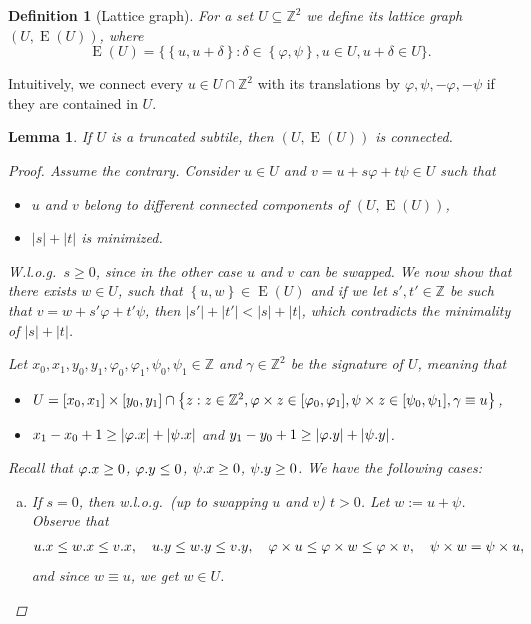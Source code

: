 \documentclass[a4paper,11pt]{article}
\newtheorem{lemma}{Lemma}[section]
\newtheorem{definition}{Definition}[section]
\newcommand{\Z}{\mathbb{Z}}
\renewcommand{\phi}{\varphi}
\newcommand{\set}[1]{\left\lbrace #1 \right\rbrace}
\newcommand{\bigset}[1]{\big \lbrace #1 \big \rbrace}
\newcommand{\eq}[1]{\begin{align*} #1 \end{align*}}
\DeclareMathOperator*{\Edges}{E}
\newcommand{\absolute}[1]{\left\lvert#1\right\rvert}
\begin{document}
\begin{definition}[Lattice graph]
	For a set $U \subseteq \Z^2$ we define its \emph{lattice graph} $(U, \Edges(U))$, where
$$\Edges(U) = \bigset{\set{u, u + \delta} : \delta \in \set{\phi, \psi}, u \in U, u + \delta \in U}.$$
\end{definition}
Intuitively, we connect every $u \in U \cap \Z^2$ with its translations by $\phi, \psi, -\phi, -\psi$ if they are contained in $U$.

\begin{lemma}\label{lattice_graph_connectivity}
	If $U$ is a truncated subtile, then $(U, \Edges(U))$ is connected.
	\begin{proof}
		Assume the contrary.
		Consider $u \in U$ and $v = u + s \phi + t \psi \in U$ such that
		\begin{itemize}
			\item $u$ and $v$ belong to different connected components of $(U, \Edges(U))$,
			\item $\absolute{s} + \absolute{t}$ is minimized.
		\end{itemize}
		W.l.o.g.~$s \ge 0$, since in the other case $u$ and $v$ can be swapped.
		We now show that there exists $w \in U$, such that $\set{u, w} \in \Edges(U)$ and if we let $s', t' \in \Z$ be such that $v = w + s'\phi + t'\psi$, then $\absolute{s'} + \absolute{t'} < \absolute{s} + \absolute{t}$, which contradicts the minimality of $\absolute{s} + \absolute{t}$. 
	
		Let $x_0, x_1, y_0, y_1, \phi_0, \phi_1, \psi_0, \psi_1 \in \Z$ and $\gamma \in \Z^2$ be the signature of $U$, meaning that
		\begin{itemize}
			\item $ U = [x_0, x_1] \times [y_0, y_1] \cap \set{z : z \in \Z^2, \h{z} \in [\phi_0, \phi_1], \s{z} \in [\psi_0, \psi_1], \gamma \equiv u}$,
			\item $x_1 - x_0 + 1 \ge \absolute{\x{\phi}} + \absolute{\x{\psi}}$ and $y_1 - y_0 + 1 \ge \absolute{\y{\phi}} + \absolute{\y{\psi}}$.
		\end{itemize}
		
		Recall that $\x{\phi} \ge 0$, $\y{\phi} \le 0$, $\psi.x \ge 0$, $\psi.y \ge 0$. We have the following cases:
		\begin{enumerate}[(a)]
			\item \label{it:s0_tneg} If $s = 0$, then w.l.o.g.~(up to swapping $u$ and $v$) $t > 0$. Let $w := u + \psi$. Observe that
				\eq{
					\x{u} \le \x{w} \le \x{v}, \quad \y{u} \le \y{w} \le \y{v}, \quad \h{u} \le \h{w} \le \h{v}, \quad \s{w} = \s{u},
				}
				and since $w \equiv u$, we get $w \in U$. 
			

\end{enumerate}
\end{proof}
\end{lemma}
\end{document}
